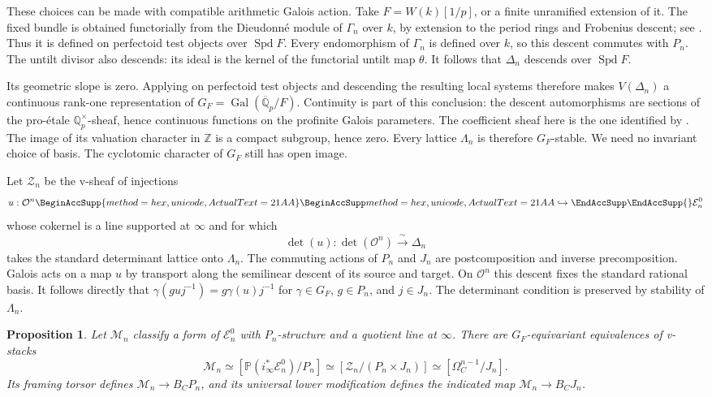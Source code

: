 \documentclass[11pt]{article}
\numberwithin{equation}{section}
\newtheorem{proposition}[theorem]{Proposition}
\theoremstyle{definition}
\theoremstyle{remark}
\newcommand{\Q}{\mathbb Q}
\newcommand{\Z}{\mathbb Z}
\newcommand{\cO}{\mathcal O}
\DeclareMathOperator{\Gal}{Gal}
\DeclareMathOperator{\Spd}{Spd}
\let\UnicodeOriginalHookrightarrow\hookrightarrow
\DeclareRobustCommand{\hookrightarrow}{
  \BeginAccSupp{method=hex,unicode,ActualText=21AA}
  \UnicodeOriginalHookrightarrow\EndAccSupp{}}
\begin{document}
These choices can be made with compatible arithmetic Galois action.
Take $F=W(k)[1/p]$, or a finite unramified extension of it.
The fixed bundle is obtained functorially from the Dieudonn\'e module
of $\Gamma_n$ over $k$, by extension to the period rings and Frobenius
descent; see \cite[Lemma 2.3.3 and the following paragraph,
pp.~23--24]{BMR2026}.  Thus it is defined on perfectoid test objects
over $\Spd F$.  Every endomorphism of $\Gamma_n$ is defined over $k$,
so this descent commutes with $P_n$.  The untilt divisor also descends:
its ideal is the kernel of the functorial untilt map $\theta$.
It follows that $\Delta_n$ descends over $\Spd F$.

Its geometric slope is zero.  Applying
\cite[Corollary II.2.20]{FS} on perfectoid test objects and descending
the resulting local systems therefore makes $V(\Delta_n)$ a
continuous rank-one representation of
$G_F=\Gal(\overline{\Q}_p/F)$.
Continuity is part of this conclusion: the descent automorphisms are
sections of the pro-\'etale $\Q_p^\times$-sheaf, hence continuous
functions on the profinite Galois parameters.  The coefficient sheaf
here is the one identified by \cite[Proposition II.2.5(ii)]{FS}.
The image of its valuation character in $\Z$ is a compact subgroup,
hence zero.  Every lattice $\Lambda_n$ is therefore $G_F$-stable.
We need no invariant choice of basis.  The cyclotomic character of
$G_F$ still has open image.

Let $\mathcal Z_n$ be the v-sheaf of injections
\[
 u:\cO^n\hookrightarrow\mathcal E_n^0
\]
whose cokernel is a line supported at $\infty$ and for which
\[
 \det(u):\det(\cO^n)\xrightarrow{\ \sim\ }\Delta_n
\]
takes the standard determinant lattice onto $\Lambda_n$.
The commuting actions of $P_n$ and $J_n$ are postcomposition and
inverse precomposition.
Galois acts on a map $u$ by transport along the semilinear descent of
its source and target.  On $\cO^n$ this descent fixes the standard
rational basis.  It follows directly that $\gamma(guj^{-1})
=g\gamma(u)j^{-1}$ for $\gamma\in G_F$, $g\in P_n$, and $j\in J_n$.
The determinant condition is preserved by stability of $\Lambda_n$.

\begin{proposition}\label{prop:two-realizations}
Let $\mathcal M_n$ classify a form of $\mathcal E_n^0$ with
$P_n$-structure and a quotient line at $\infty$.  There are
$G_F$-equivariant equivalences of v-stacks
\begin{equation}\label{eq:two-realizations}
 \mathcal M_n
 \simeq [\mathbb P(i_\infty^*\mathcal E_n^0)/P_n]
 \simeq [\mathcal Z_n/(P_n\times J_n)]
 \simeq [\Omega_C^{n-1}/J_n].
\end{equation}
Its framing torsor defines $\mathcal M_n\to B_CP_n$, and its universal
lower modification defines the indicated map $\mathcal M_n\to B_CJ_n$.
\end{proposition}
\end{document}
